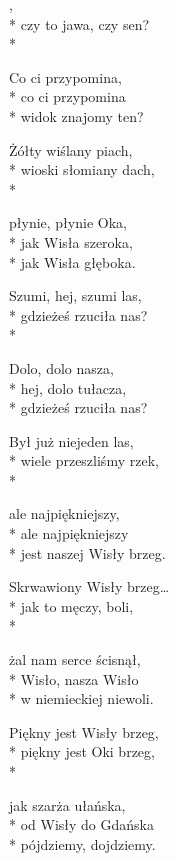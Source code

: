 \begin{lyrics}[longestline={jest naszej Wisły brzeg.}]

,\\*
czy to jawa, czy sen?\\*
\begin{markverses}%
Co ci przypomina,\\*
co ci przypomina\\*
widok znajomy ten?
\end{markverses}

Żółty wiślany piach,\\*
wioski słomiany dach,\\*
\begin{markverses}%
płynie, płynie Oka,\\*
jak Wisła szeroka,\\*
jak Wisła głęboka.
\end{markverses}

Szumi, hej, szumi las,\\*
gdzieżeś rzuciła nas?\\*
\begin{markverses}%
Dolo, dolo nasza,\\*
hej, dolo tułacza,\\*
gdzieżeś rzuciła nas?
\end{markverses}

Był już niejeden las,\\*
wiele przeszliśmy rzek,\\*
\begin{markverses}%
ale najpiękniejszy,\\*
ale najpiękniejszy\\*
jest naszej Wisły brzeg.
\end{markverses}

Skrwawiony Wisły brzeg…\\*
jak to męczy, boli,\\*
\begin{markverses}%
żal nam serce ścisnął,\\*
Wisło, nasza Wisło\\*
w niemieckiej niewoli.
\end{markverses}

Piękny jest Wisły brzeg,\\*
piękny jest Oki brzeg,\\*
\begin{markverses}%
jak szarża ułańska,\\*
od Wisły do Gdańska\\*
pójdziemy, dojdziemy.
\end{markverses}
\end{lyrics}



